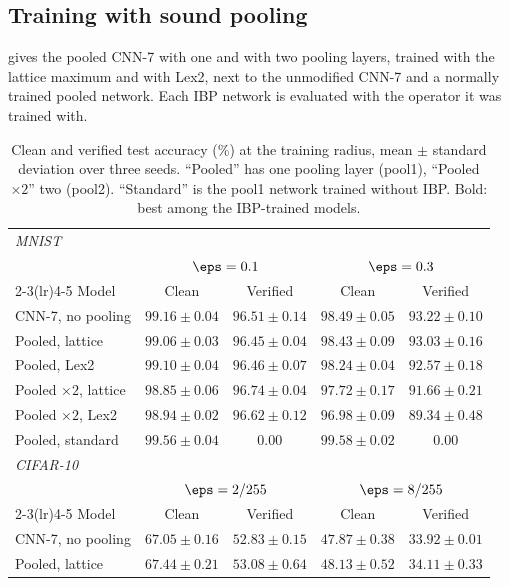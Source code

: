 \subsection{Training with sound pooling}

 gives the pooled CNN-7 with one and with two pooling layers, trained with the lattice maximum and with Lex2, next to the unmodified CNN-7 and a normally trained pooled network. Each IBP network is evaluated with the operator it was trained with.

\begin{table}[h]
\centering
\caption{Clean and verified test accuracy (\%) at the training radius, mean $\pm$ standard deviation over three seeds. ``Pooled'' has one pooling layer (pool1), ``Pooled $\times2$'' two (pool2). ``Standard'' is the pool1 network trained without IBP. Bold: best among the IBP-trained models.}
\label{tab:train}
\begin{tabular}{lcccc}
\toprule
\multicolumn{5}{l}{\emph{MNIST}} \\
 & \multicolumn{2}{c}{$\eps=0.1$} & \multicolumn{2}{c}{$\eps=0.3$} \\
\cmidrule(lr){2-3}\cmidrule(lr){4-5}
Model & Clean & Verified & Clean & Verified \\
\midrule
CNN-7, no pooling & $\mathbf{99.16\pm0.04}$ & $96.51\pm0.14$ & $\mathbf{98.49\pm0.05}$ & $\mathbf{93.22\pm0.10}$ \\
Pooled, lattice   & $99.06\pm0.03$ & $96.45\pm0.04$ & $98.43\pm0.09$ & $93.03\pm0.16$ \\
Pooled, Lex2      & $99.10\pm0.04$ & $96.46\pm0.07$ & $98.24\pm0.04$ & $92.57\pm0.18$ \\
Pooled $\times2$, lattice & $98.85\pm0.06$ & $\mathbf{96.74\pm0.04}$ & $97.72\pm0.17$ & $91.66\pm0.21$ \\
Pooled $\times2$, Lex2    & $98.94\pm0.02$ & $96.62\pm0.12$ & $96.98\pm0.09$ & $89.34\pm0.48$ \\
Pooled, standard  & $99.56\pm0.04$ & $0.00$ & $99.58\pm0.02$ & $0.00$ \\
\midrule
\multicolumn{5}{l}{\emph{CIFAR-10}} \\
 & \multicolumn{2}{c}{$\eps=2/255$} & \multicolumn{2}{c}{$\eps=8/255$} \\
\cmidrule(lr){2-3}\cmidrule(lr){4-5}
Model & Clean & Verified & Clean & Verified \\
\midrule
CNN-7, no pooling & $67.05\pm0.16$ & $52.83\pm0.15$ & $47.87\pm0.38$ & $33.92\pm0.01$ \\
Pooled, lattice   & $\mathbf{67.44\pm0.21}$ & $\mathbf{53.08\pm0.64}$ & $\mathbf{48.13\pm0.52}$ & $\mathbf{34.11\pm0.33}$ \\

\end{tabular}
\end{table}
